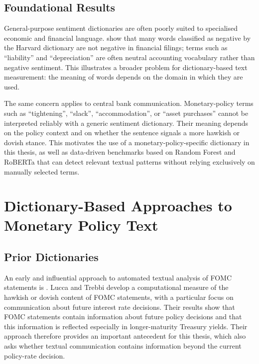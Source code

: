 \subsection{Foundational Results}

General-purpose sentiment dictionaries are often poorly suited to
specialised economic and financial language. \citet{loughran2011}
show that many words classified as negative by the Harvard dictionary
are not negative in financial filings; terms such as ``liability'' and
``depreciation'' are often neutral accounting vocabulary rather than
negative sentiment. This illustrates a broader problem for
dictionary-based text measurement: the meaning of words depends on the
domain in which they are used.

The same concern applies to central bank communication. Monetary-policy
terms such as ``tightening'', ``slack'', ``accommodation'', or ``asset
purchases'' cannot be interpreted reliably with a generic sentiment
dictionary. Their meaning depends on the policy context and on whether
the sentence signals a more hawkish or dovish stance. This motivates the
use of a monetary-policy-specific dictionary in this thesis, as well as
data-driven benchmarks based on Random Forest and RoBERTa that can
detect relevant textual patterns without relying exclusively on manually
selected terms.


\section{Dictionary-Based Approaches to Monetary Policy Text}
\label{sec:lit_dictionary}

\subsection{Prior Dictionaries}
An early and influential approach to automated textual analysis of FOMC
statements is \citet{lucca2009}. Lucca and Trebbi develop a
computational measure of the hawkish or dovish content of FOMC
statements, with a particular focus on communication about future
interest rate decisions. Their results show that FOMC statements contain
information about future policy decisions and that this information is
reflected especially in longer-maturity Treasury yields. Their approach
therefore provides an important antecedent for this thesis, which also
asks whether textual communication contains information beyond the
current policy-rate decision.

